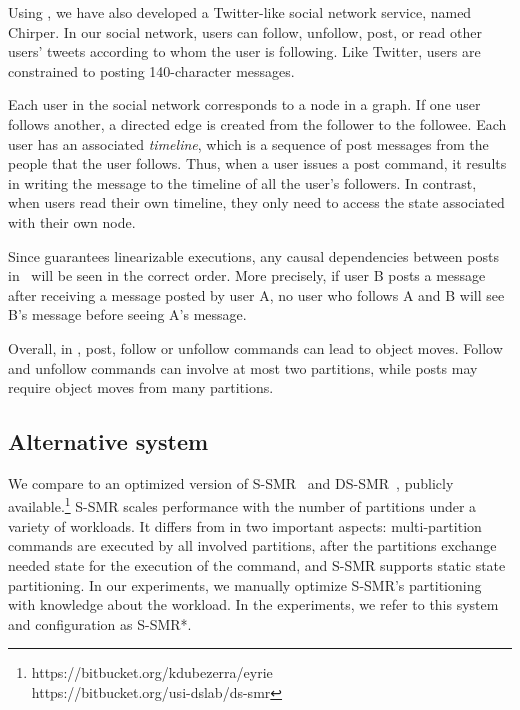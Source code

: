 Using \dynastar{}, we have also developed a Twitter-like social network service,
named Chirper. In our social network, users can follow, unfollow, post, or read
other users' tweets according to whom the user is following. Like Twitter, users
are constrained to posting 140-character messages.

Each user in the social network corresponds to a node in a graph. If one user
follows another, a directed edge is created from the follower to the followee.
Each user has an associated \emph{timeline}, which is a sequence of post
messages from the people that the user follows. Thus, when a user issues a post
command, it results in writing the message to the timeline of all the user's
followers.  In contrast, when users read their own timeline, they only need to
access the state associated with their own node.

Since \dynastar guarantees linearizable executions, any causal dependencies
between posts in \dynastarappname\ will be seen in the correct order. More
precisely, if user B posts a message after receiving a message posted by user A,
no user who follows A and B will see B's message before seeing A's message.

Overall, in \dynastarappname, post, follow or unfollow commands can lead to
object moves.  Follow and unfollow commands can involve at most two partitions,
while posts may require object moves from many partitions.



\subsection{Alternative system}

We compare \dynastar{} to an optimized version of S-SMR~\cite{bezerra2014ssmr}
and DS-SMR~\cite{le2016dssmr}, publicly
available.\footnote{https://bitbucket.org/kdubezerra/eyrie\\
https://bitbucket.org/usi-dslab/ds-smr} S-SMR scales performance with the number
of partitions under a variety of workloads. It differs from \dynastar{} in two
important aspects: multi-partition commands are executed by all involved
partitions, after the partitions exchange needed state for the execution of the
command, and S-SMR supports static state partitioning. In our experiments, we
manually optimize S-SMR's partitioning with knowledge about the workload. In the
experiments, we refer to this system and configuration as S-SMR*.

